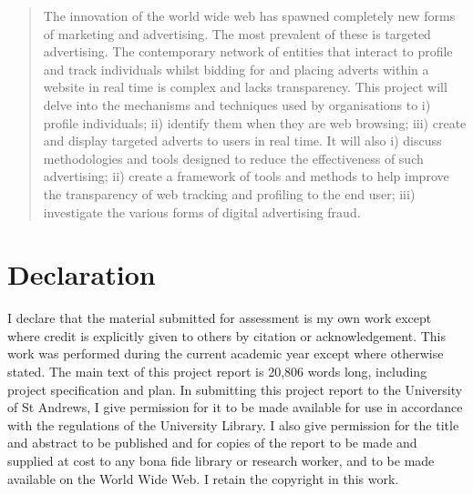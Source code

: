 \documentclass[12pt]{article}
\begin{document}
\pagestyle{plain}
\begin{abstract}
The innovation of the world wide web has spawned completely new forms of marketing and advertising. The most prevalent of these  is targeted advertising. The contemporary network of entities that interact to profile and track individuals whilst  bidding for and placing adverts within a website in real time is complex and lacks transparency. This project will delve into the mechanisms and techniques used by organisations to i) profile individuals; ii) identify them when they are web browsing; iii) create and display targeted adverts to users in real time. It will also i) discuss methodologies and tools designed to reduce the effectiveness of such advertising;  ii) create a framework of tools and methods to help improve the transparency of web tracking and profiling to the end user; iii) investigate the various forms of digital advertising fraud.  
\end{abstract}

\section{Declaration}
I declare that the material submitted for assessment is my own work except where credit is explicitly
given to others by citation or acknowledgement. This work was performed during the current academic year
except where otherwise stated. The main text of this project report is 20,806 words long,
including project specification and plan. In submitting this project report to the University of St
Andrews, I give permission for it to be made available for use in accordance with the regulations of the
University Library. I also give permission for the title and abstract to be published and for copies of the report to be made and supplied at cost to any bona fide library or research worker, and to be made available on the World Wide Web. I retain the copyright in this work.

\pagebreak

\tableofcontents

\pagebreak

\pagestyle{fancy}
\end{document}
